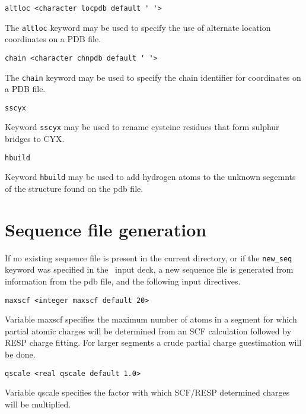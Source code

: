 \begin{verbatim}
altloc <character locpdb default ' '>
\end{verbatim}

The \verb+altloc+ keyword may be used to specify the use of alternate
location coordinates on a PDB file.

\begin{verbatim}
chain <character chnpdb default ' '>
\end{verbatim}

The \verb+chain+ keyword may be used to specify the chain identifier
for coordinates on a PDB file.

\begin{verbatim}
sscyx
\end{verbatim}

Keyword \verb+sscyx+ may be used to rename cysteine residues that form
sulphur bridges to CYX.

\begin{verbatim}
hbuild
\end{verbatim}

Keyword \verb+hbuild+ may be used to add hydrogen atoms to the
unknown segemnts of the structure found on the pdb file.


\section{Sequence file generation}

If no existing sequence file is present in the current directory,
or if the \verb+new_seq+ keyword was specified in the \prepare\ 
input deck, a new sequence file is generated from information
from the pdb file, and the following input directives.

\begin{verbatim}
maxscf <integer maxscf default 20>
\end{verbatim}

Variable maxscf specifies the maximum number of atoms in a segment for
which partial atomic charges will be determined from an SCF calculation
followed by RESP charge fitting. For larger segments a crude partial
charge guestimation will be done.

\begin{verbatim}
qscale <real qscale default 1.0>
\end{verbatim}

Variable qscale specifies the factor with which SCF/RESP determined
charges will be multiplied.

